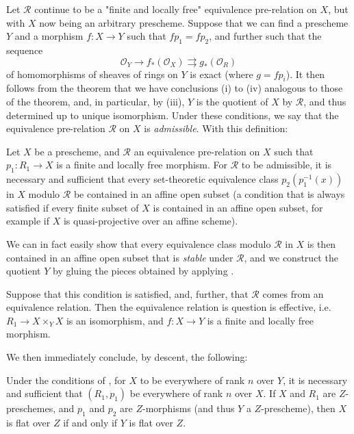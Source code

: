 Let $\mathcal{R}$ continue to be a "finite and locally free" equivalence pre-relation on $X$, but with $X$ now being an arbitrary prescheme.
Suppose that we can find a prescheme $Y$ and a morphism $f\colon X\to Y$ such that $fp_1=fp_2$, and further such that the sequence
\[
    \mathcal{O}_Y \to f_*(\mathcal{O}_X) \rightrightarrows g_*(\mathcal{O}_R)
\]
of homomorphisms of sheaves of rings on $Y$ is exact (where $g=fp_i$).
It then follows from the theorem that we have conclusions (i) to (iv) analogous to those of the theorem, and, in particular, by (iii), $Y$ is the quotient of $X$ by $\mathcal{R}$, and thus determined up to unique isomorphism.
Under these conditions, we say that the equivalence pre-relation $\mathcal{R}$ on $X$ is \emph{admissible}.
With this definition:


\begin{theorem}\label{fga3.iii-5-theorem-5.3}
    Let $X$ be a prescheme, and $\mathcal{R}$ an equivalence pre-relation on $X$ such that $p_1\colon R_1\to X$ is a finite and locally free morphism.
    For $\mathcal{R}$ to be admissible, it is necessary and sufficient that every set-theoretic equivalence class $p_2(p_1^{-1}(x))$ in $X$ modulo $\mathcal{R}$ be contained in an affine open subset (a condition that is always satisfied if every finite subset of $X$ is contained in an affine open subset, for example if $X$ is quasi-projective over an affine scheme).
\end{theorem}


We can in fact easily show that every equivalence class modulo $\mathcal{R}$ in $X$ is then contained in an affine open subset that is \emph{stable} under $\mathcal{R}$, and we construct the quotient $Y$ by gluing the pieces obtained by applying .


\begin{corollary}\label{fga3.iii-5-corollary-5.4}
    Suppose that this condition is satisfied, and, further, that $\mathcal{R}$ comes from an equivalence relation.
    Then the equivalence relation is question is effective, i.e. $R_1\to X\times_Y X$ is an isomorphism, and $f\colon X\to Y$ is a finite and locally free morphism.
\end{corollary}


We then immediately conclude, by descent, the following:


\begin{corollary}\label{fga3.iii-5-corollary-5.5}
    Under the conditions of , for $X$ to be everywhere of rank $n$ over $Y$, it is necessary and sufficient that $(R_1,p_1)$ be everywhere of rank $n$ over $X$.
    If $X$ and $R_1$ are $Z$-preschemes, and $p_1$ and $p_2$ are $Z$-morphisms (and thus $Y$ a $Z$-prescheme), then $X$ is flat over $Z$ if and only if $Y$ is flat over $Z$.
\end{corollary}

